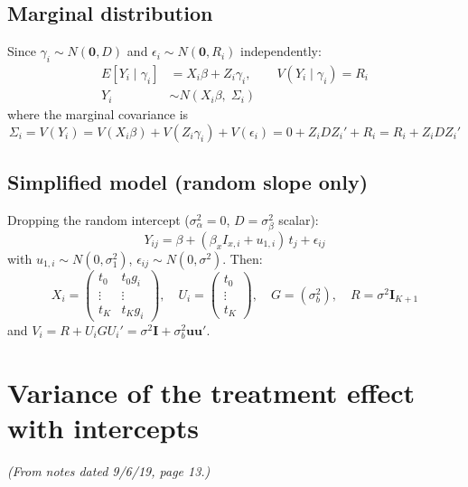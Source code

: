\documentclass[11pt]{article}
\newcommand{\bI}{\mathbf{I}}
\newcommand{\bu}{\mathbf{u}}
\begin{document}
\subsection{Marginal distribution}

Since $\gamma_i \sim N(\mathbf{0}, D)$ and
$\epsilon_i \sim N(\mathbf{0}, R_i)$ independently:
\begin{align}
  E[Y_i \mid \gamma_i] &= X_i\beta + Z_i\gamma_i, \qquad
    V(Y_i \mid \gamma_i) = R_i \\
  Y_i &\sim N(X_i\beta,\; \Sigma_i)
\end{align}
where the marginal covariance is
\begin{equation}
  \Sigma_i = V(Y_i)
  = V(X_i\beta) + V(Z_i\gamma_i) + V(\epsilon_i)
  = 0 + Z_i D Z_i' + R_i
  = R_i + Z_i D Z_i'
  \label{eq:sigma}
\end{equation}


\subsection{Simplified model (random slope only)}

Dropping the random intercept
($\sigma_\alpha^2 = 0$, $D = \sigma_\beta^2$ scalar):
\begin{equation}
  Y_{ij} = \beta + (\beta_x I_{x,i} + u_{1,i})\, t_j
    + \epsilon_{ij}
\end{equation}
with $u_{1,i} \sim N(0, \sigma_1^2)$,
$\epsilon_{ij} \sim N(0, \sigma^2)$. Then:
\begin{equation}
  X_i = \begin{pmatrix}
    t_0 & t_0 g_i \\
    \vdots & \vdots \\
    t_K & t_K g_i
  \end{pmatrix}, \quad
  U_i = \begin{pmatrix}
    t_0 \\ \vdots \\ t_K
  \end{pmatrix}, \quad
  G = (\sigma_b^2), \quad
  R = \sigma^2 \bI_{K+1}
\end{equation}
and $V_i = R + U_i G U_i' = \sigma^2 \bI + \sigma_b^2
\bu\bu'$.


\section{Variance of the treatment effect with intercepts}
\label{sec:var_full}

\noindent
\textit{(From notes dated 9/6/19, page 13.)}
\end{document}
